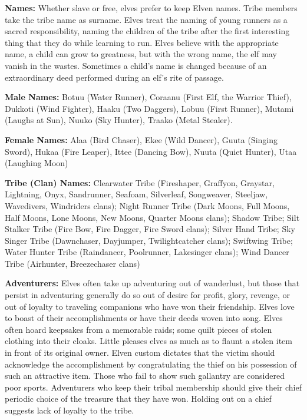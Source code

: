 \textbf{Names:} Whether slave or free, elves prefer to keep Elven names. Tribe members take the tribe name as surname. Elves treat the naming of young runners as a sacred responsibility, naming the children of the tribe after the first interesting thing that they do while learning to run. Elves believe with the appropriate name, a child can grow to greatness, but with the wrong name, the elf may vanish in the wastes. Sometimes a child's name is changed because of an extraordinary deed performed during an elf's rite of passage.

\textbf{Male Names:} Botuu (Water Runner), Coraanu (First Elf, the Warrior Thief), Dukkoti (Wind Fighter), Haaku (Two Daggers), Lobuu (First Runner), Mutami (Laughs at Sun), Nuuko (Sky Hunter), Traako (Metal Stealer).

\textbf{Female Names:} Alaa (Bird Chaser), Ekee (Wild Dancer), Guuta (Singing Sword), Hukaa (Fire Leaper), Ittee (Dancing Bow), Nuuta (Quiet Hunter), Utaa (Laughing Moon)

\textbf{Tribe (Clan) Names:} Clearwater Tribe (Fireshaper, Graffyon, Graystar, Lightning, Onyx, Sandrunner, Seafoam, Silverleaf, Songweaver, Steeljaw, Wavedivers, Windriders clans); Night Runner Tribe (Dark Moons, Full Moons, Half Moons, Lone Moons, New Moons, Quarter Moons clans); Shadow Tribe; Silt Stalker Tribe (Fire Bow, Fire Dagger, Fire Sword clans); Silver Hand Tribe; Sky Singer Tribe (Dawnchaser, Dayjumper, Twilightcatcher clans); Swiftwing Tribe; Water Hunter Tribe (Raindancer, Poolrunner, Lakesinger clans); Wind Dancer Tribe (Airhunter, Breezechaser clans)

\textbf{Adventurers:} Elves often take up adventuring out of wanderlust, but those that persist in adventuring generally do so out of desire for profit, glory, revenge, or out of loyalty to traveling companions who have won their friendship. Elves love to boast of their accomplishments or have their deeds woven into song. Elves often hoard keepsakes from a memorable raids; some quilt pieces of stolen clothing into their cloaks. Little pleases elves as much as to flaunt a stolen item in front of its original owner. Elven custom dictates that the victim should acknowledge the accomplishment by congratulating the thief on his possession of such an attractive item. Those who fail to show such gallantry are considered poor sports. Adventurers who keep their tribal membership should give their chief periodic choice of the treasure that they have won. Holding out on a chief suggests lack of loyalty to the tribe.

